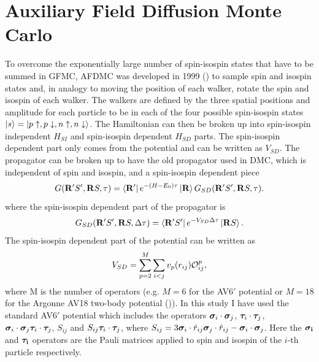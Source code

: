 \section{Auxiliary Field Diffusion Monte Carlo}
\label{sec:AFDMC}
To overcome the exponentially large number of spin-isospin states that have to be summed in GFMC, AFDMC was developed in 1999 (\cite{schmidt1999}) to sample spin and isospin states and, in analogy to moving the position of each walker, rotate the spin and isospin of each walker. The walkers are defined by the three spatial positions and amplitude for each particle to be in each of the four possible spin-isospin states $\left| s \right> = \left| p\uparrow,p\downarrow,n\uparrow,n\downarrow \right>$. The Hamiltonian can then be broken up into spin-isospin independent $H_{SI}$ and spin-isospin dependent $H_{SD}$ parts. The spin-isospin dependent part only comes from the potential and can be written as $V_{SD}$. The propagator can be broken up to have the old propagator used in DMC, which is independent of spin and isospin, and a spin-isospin dependent piece
\begin{equation}
   G(\mathbf{R}'S',\mathbf{R} S,\tau)=\left< \mathbf{R}' \right|e^{-(H-E_0)\tau}\left| \mathbf{R} \right>G_{SD}(\mathbf{R}'S',\mathbf{R} S,\tau).
\end{equation}
where the spin-isospin dependent part of the propagator is
\begin{equation}
   G_{SD}(\mathbf{R}'S',\mathbf{R} S,\Delta\tau) = \left< \mathbf{R}'S' \right|e^{-V_{SD}\Delta\tau} \left| \mathbf{R} S \right>.
\end{equation}
The spin-isospin dependent part of the potential can be written as
\begin{equation}
   V_{SD} = \sum\limits_{p=2}^{M}\sum\limits_{i<j} v_p(r_{ij})\mathcal{O}_{ij}^p,
\end{equation}
where M is the number of operators (e.g. $M=6$ for the AV6$'$ potential or $M=18$ for the Argonne AV18 two-body potential (\cite{wiringa1984})). In this study I have used the standard AV6$'$ potential which includes the operators $\bm{\sigma}_i\cdot\bm{\sigma}_j$, $\bm{\tau}_i\cdot\bm{\tau}_j$, $\bm{\sigma}_i\cdot\bm{\sigma}_j \bm{\tau}_i\cdot\bm{\tau}_j$, $S_{ij}$ and $S_{ij} \bm{\tau}_i\cdot\bm{\tau}_j$, where $S_{ij} = 3\bm{\sigma}_i\cdot\hat{r}_{ij}\bm{\sigma}_j\cdot\hat{r}_{ij}-\bm{\sigma}_i\cdot\bm{\sigma}_j$. Here the $\mathbf{\bm{\sigma}_i}$ and $\mathbf{\bm{\tau}_i}$ operators are the Pauli matrices applied to spin and isospin of the $i$-th particle respectively.

